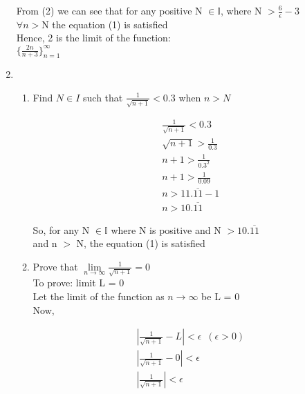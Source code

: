 \documentclass[11pt, letterpaper]{article}
\begin{document}
\begin{enumerate}
{\begin{enumerate}
{				\begin{center}
					From (2) we can see that for any positive N $\in \mathbb{I}$, where N $> \frac{6}{\epsilon} - 3$\\
					$\forall n > \mathrm{N}$ the equation (1) is satisfied\\
					Hence, 2 is the limit of the function: \\
					$ \lbrace \frac{2n}{n+3} \rbrace_{n=1}^\infty $
				\end{center}
			}
		\end{enumerate}			
	}
	
	\item{
		\begin{enumerate}
			\item{Find $N \in I$ such that $\frac{1}{\sqrt{n+1}} < 0.3 $ when $n > N$ 
				\setcounter{equation}{0}
				
				\begin{eqnarray}
					\frac{1}{\sqrt{n+1}} < 0.3 \\
					\sqrt{n+1} > \frac{1}{0.3} \nonumber \\
					n+1 > \frac{1}{0.3^2} \nonumber \\
					n+1 > \frac{1}{0.09} \nonumber \\
					n > 11.\overline{11} - 1 \nonumber \\
					n > 10.\overline{11}
				\end{eqnarray}			
				
				\begin{center}
					So, for any N $\in \mathbb{I}$ where N is positive and N $> 10.\overline{11}$\\
					and n $>$ N, the equation (1) is satisfied
				\end{center}								
			}
			\item{Prove that $\lim \limits_{n \to \infty} \frac{1}{\sqrt{n+1}} = 0$\\
				To prove: limit L = 0\\
				Let the limit of the function as $n \to \infty$ be L = 0\\
				Now, \\
				
				\setcounter{equation}{0}
				
				\begin{eqnarray}
					\left| \frac{1}{\sqrt{n+1}} - L \right| < \epsilon \,\,\, (\epsilon > 0)\\
					\left| \frac{1}{\sqrt{n+1}} - 0 \right| < \epsilon \nonumber \\
					\left| \frac{1}{\sqrt{n+1}} \right| < \epsilon 
				\end{eqnarray}
				
}
\end{enumerate}}
\end{enumerate}
\end{document}
